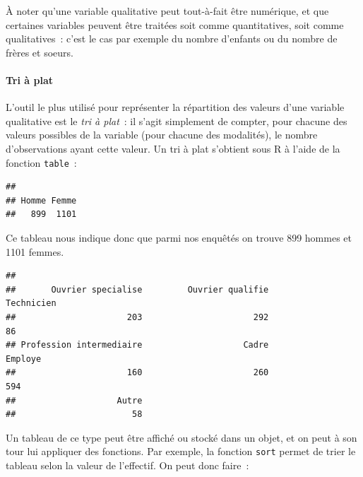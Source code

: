 \documentclass[
  12pt,
]{book}
\newenvironment{Shaded}{\begin{snugshade}}{\end{snugshade}}
\newcommand{\KeywordTok}[1]{\textcolor[rgb]{0.13,0.29,0.53}{\textbf{#1}}}
\newcommand{\NormalTok}[1]{#1}
\newcommand{\OperatorTok}[1]{\textcolor[rgb]{0.81,0.36,0.00}{\textbf{#1}}}
\begin{document}
À noter qu'une variable qualitative peut tout-à-fait être numérique, et que certaines variables peuvent être traitées soit comme quantitatives, soit comme qualitatives~: c'est le cas par exemple du nombre d'enfants ou du nombre de frères et soeurs.

\hypertarget{tri-uxe0-plat}{%
\paragraph{Tri à plat}\label{tri-uxe0-plat}}

L'outil le plus utilisé pour représenter la répartition des valeurs d'une variable qualitative est le \emph{tri à plat}~: il s'agit simplement de compter, pour chacune des valeurs possibles de la variable (pour chacune des modalités), le nombre d'observations ayant cette valeur. Un tri à plat s'obtient sous R à l'aide de la fonction \texttt{table}~:

\begin{Shaded}
\end{Shaded}

\begin{verbatim}
## 
## Homme Femme 
##   899  1101
\end{verbatim}

Ce tableau nous indique donc que parmi nos enquêtés on trouve 899 hommes et 1101 femmes.

\begin{Shaded}
\end{Shaded}

\begin{verbatim}
## 
##       Ouvrier specialise         Ouvrier qualifie               Technicien 
##                      203                      292                       86 
## Profession intermediaire                    Cadre                  Employe 
##                      160                      260                      594 
##                    Autre 
##                       58
\end{verbatim}

Un tableau de ce type peut être affiché ou stocké dans un objet, et on peut à son tour lui appliquer des fonctions. Par exemple, la fonction \texttt{sort} permet de trier le tableau selon la valeur de l'effectif. On peut donc faire~:
\end{document}
